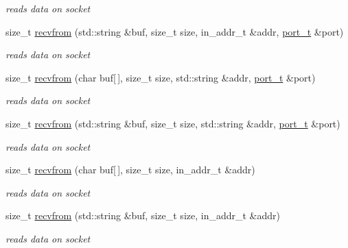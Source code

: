 \begin{CompactItemize}
\begin{CompactList}\small\item\em reads data on socket \item\end{CompactList}\item 
size\_\-t \hyperlink{classsocketpp_1_1BaseSocket_d2656c57d84c4ff032cd3d9ad4608bfa}{recvfrom} (std::string \&buf, size\_\-t size, in\_\-addr\_\-t \&addr, \hyperlink{namespacesocketpp_5517ef80f249b891a2ba64b95fc1e723}{port\_\-t} \&port)
\begin{CompactList}\small\item\em reads data on socket \item\end{CompactList}\item 
size\_\-t \hyperlink{classsocketpp_1_1BaseSocket_205fc515468a3df01258f7ebd6fdf38c}{recvfrom} (char buf\mbox{[}$\,$\mbox{]}, size\_\-t size, std::string \&addr, \hyperlink{namespacesocketpp_5517ef80f249b891a2ba64b95fc1e723}{port\_\-t} \&port)
\begin{CompactList}\small\item\em reads data on socket \item\end{CompactList}\item 
size\_\-t \hyperlink{classsocketpp_1_1BaseSocket_259bb054a2abf0ffadf3c75bce4892b0}{recvfrom} (std::string \&buf, size\_\-t size, std::string \&addr, \hyperlink{namespacesocketpp_5517ef80f249b891a2ba64b95fc1e723}{port\_\-t} \&port)
\begin{CompactList}\small\item\em reads data on socket \item\end{CompactList}\item 
size\_\-t \hyperlink{classsocketpp_1_1BaseSocket_ed28eb7e4a5abee65143bcdf162673f4}{recvfrom} (char buf\mbox{[}$\,$\mbox{]}, size\_\-t size, in\_\-addr\_\-t \&addr)
\begin{CompactList}\small\item\em reads data on socket \item\end{CompactList}\item 
size\_\-t \hyperlink{classsocketpp_1_1BaseSocket_8224b8434da862a72b774a3c80006fcb}{recvfrom} (std::string \&buf, size\_\-t size, in\_\-addr\_\-t \&addr)
\begin{CompactList}\small\item\em reads data on socket \item\end{CompactList}\item 

\end{CompactItemize}
